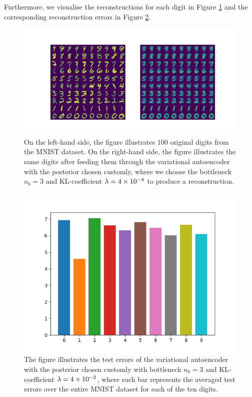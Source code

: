 Furthermore, we visualise the reconstructions for each digit in Figure \ref{fig:convolutional_VAE_new_idea_KL_4e-2_10k_epochs_3D_inference} and the corresponding reconstruction errors in Figure \ref{fig:convolutional_VAE_new_idea_KL_4e-2_10k_epochs_3D_errors}.


\begin{figure}
\begin{center}
      \includegraphics[trim = 15mm 10mm 15mm 15mm, clip, width=\linewidth]{convolutional_VAE_new_idea_KL_4e-2_10k_epochs_3D_inference}
\end{center}
\caption{On the left-hand side, the figure illustrates $100$ original digits from the MNIST dataset. On the right-hand side, the figure illustrates the same digits after feeding them through the variational autoencoder with the posterior chosen customly, where we choose the bottleneck $n_b=3$ and KL-coefficient $\lambda = \num{4e-4}$ to produce a reconstruction.}\label{fig:convolutional_VAE_new_idea_KL_4e-2_10k_epochs_3D_inference}
\end{figure}


\begin{figure}
\begin{center}
      \includegraphics[width=0.49\linewidth]{convolutional_VAE_new_idea_KL_4e-2_10k_epochs_3D_errors}
\end{center}
\caption{The figure illustrates the test errors of the variational autoencoder with the posterior chosen customly with bottleneck $n_b=3$ and KL-coefficient $\lambda = \num{4e-2}$, where each bar represents the averaged test errors over the entire MNIST dataset for each of the ten digits.}\label{fig:convolutional_VAE_new_idea_KL_4e-2_10k_epochs_3D_errors}
\end{figure}


